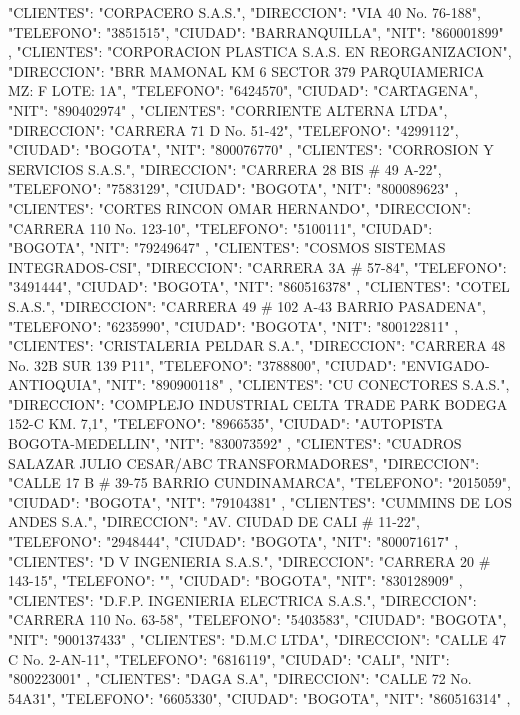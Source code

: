    {
   "CLIENTES": "CORPACERO S.A.S.",
   "DIRECCION": "VIA 40 No. 76-188",
   "TELEFONO": "3851515",
   "CIUDAD": "BARRANQUILLA",
   "NIT": "860001899"
   },
   {
   "CLIENTES": "CORPORACION PLASTICA S.A.S. EN REORGANIZACION",
   "DIRECCION": "BRR MAMONAL KM 6 SECTOR 379 PARQUIAMERICA MZ: F LOTE: 1A",
   "TELEFONO": "6424570",
   "CIUDAD": "CARTAGENA",
   "NIT": "890402974"
   },
   {
   "CLIENTES": "CORRIENTE ALTERNA LTDA",
   "DIRECCION": "CARRERA 71 D No. 51-42",
   "TELEFONO": "4299112",
   "CIUDAD": "BOGOTA",
   "NIT": "800076770"
   },
   {
   "CLIENTES": "CORROSION Y SERVICIOS S.A.S.",
   "DIRECCION": "CARRERA 28 BIS # 49 A-22",
   "TELEFONO": "7583129",
   "CIUDAD": "BOGOTA",
   "NIT": "800089623"
   },
   {
   "CLIENTES": "CORTES RINCON OMAR HERNANDO",
   "DIRECCION": "CARRERA 110 No. 123-10",
   "TELEFONO": "5100111",
   "CIUDAD": "BOGOTA",
   "NIT": "79249647"
   },
   {
   "CLIENTES": "COSMOS SISTEMAS INTEGRADOS-CSI",
   "DIRECCION": "CARRERA 3A # 57-84",
   "TELEFONO": "3491444",
   "CIUDAD": "BOGOTA",
   "NIT": "860516378"
   },
   {
   "CLIENTES": "COTEL S.A.S.",
   "DIRECCION": "CARRERA 49 # 102 A-43 BARRIO PASADENA",
   "TELEFONO": "6235990",
   "CIUDAD": "BOGOTA",
   "NIT": "800122811"
   },
   {
   "CLIENTES": "CRISTALERIA PELDAR S.A.",
   "DIRECCION": "CARRERA 48 No. 32B SUR 139 P11",
   "TELEFONO": "3788800",
   "CIUDAD": "ENVIGADO-ANTIOQUIA",
   "NIT": "890900118"
   },
   {
   "CLIENTES": "CU CONECTORES S.A.S.",
   "DIRECCION": "COMPLEJO INDUSTRIAL CELTA TRADE PARK BODEGA 152-C KM. 7,1",
   "TELEFONO": "8966535",
   "CIUDAD": "AUTOPISTA BOGOTA-MEDELLIN",
   "NIT": "830073592"
   },
   {
   "CLIENTES": "CUADROS SALAZAR JULIO CESAR/ABC TRANSFORMADORES",
   "DIRECCION": "CALLE 17 B # 39-75 BARRIO CUNDINAMARCA",
   "TELEFONO": "2015059",
   "CIUDAD": "BOGOTA",
   "NIT": "79104381"
   },
   {
   "CLIENTES": "CUMMINS DE LOS ANDES S.A.",
   "DIRECCION": "AV. CIUDAD DE CALI # 11-22",
   "TELEFONO": "2948444",
   "CIUDAD": "BOGOTA",
   "NIT": "800071617"
   },
   {
   "CLIENTES": "D V INGENIERIA S.A.S.",
   "DIRECCION": "CARRERA 20 # 143-15",
   "TELEFONO": "",
   "CIUDAD": "BOGOTA",
   "NIT": "830128909"
   },
   {
   "CLIENTES": "D.F.P. INGENIERIA ELECTRICA S.A.S.",
   "DIRECCION": "CARRERA 110 No. 63-58",
   "TELEFONO": "5403583",
   "CIUDAD": "BOGOTA",
   "NIT": "900137433"
   },
   {
   "CLIENTES": "D.M.C LTDA",
   "DIRECCION": "CALLE 47 C No. 2-AN-11",
   "TELEFONO": "6816119",
   "CIUDAD": "CALI",
   "NIT": "800223001"
   },
   {
   "CLIENTES": "DAGA S.A",
   "DIRECCION": "CALLE 72 No. 54A31",
   "TELEFONO": "6605330",
   "CIUDAD": "BOGOTA",
   "NIT": "860516314"
   },
